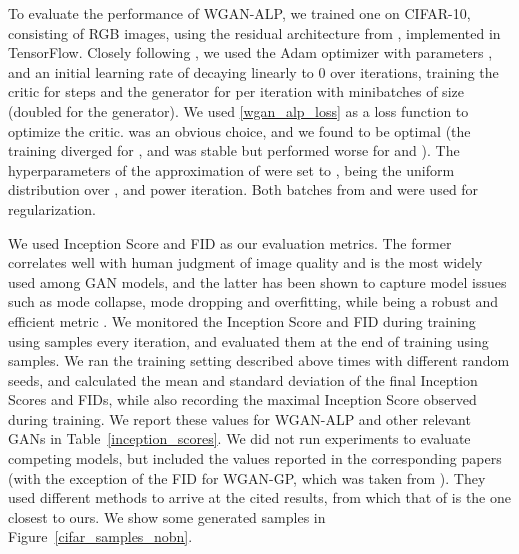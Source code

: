 \documentclass{article}
\begin{document}
To evaluate the performance of WGAN-ALP, we trained one on CIFAR-10, consisting of  RGB images, using the residual architecture from \citet{Gulrajanietal2017}, implemented in TensorFlow. Closely following \citet{Gulrajanietal2017}, we used the Adam optimizer \citep{Kingmaetal2014} with parameters ,  and an initial learning rate of  decaying linearly to 0 over  iterations, training the critic for  steps and the generator for  per iteration with minibatches of size  (doubled for the generator). We used \eqref{wgan_alp_loss} as a loss function to optimize the critic.  was an obvious choice, and we found  to be optimal (the training diverged for , and was stable but performed worse for  and ). The hyperparameters of the approximation of  were set to ,  being the uniform distribution over , and  power iteration. Both batches from  and  were used for regularization.

We used Inception Score \citep{Salimansetal2016} and FID \citep{Heuseletal2017} as our evaluation metrics. The former correlates well with human judgment of image quality and is the most widely used among GAN models, and the latter has been shown to capture model issues such as mode collapse, mode dropping and overfitting, while being a robust and efficient metric \citep{Xuetal2018}. We monitored the Inception Score and FID during training using  samples every  iteration, and evaluated them at the end of training using  samples. We ran the training setting described above  times with different random seeds, and calculated the mean and standard deviation of the final Inception Scores and FIDs, while also recording the maximal Inception Score observed during training. We report these values for WGAN-ALP and other relevant GANs \citep{Gulrajanietal2017, Petzkaetal2018, Zhouetal2019b, Weietal2018, Miyatoetal2018, Adleretal2018, Karrasetal2017} in Table~\ref{inception_scores}. We did not run experiments to evaluate competing models, but included the values reported in the corresponding papers (with the exception of the FID for WGAN-GP, which was taken from \citet{Zhouetal2019b}). They used different methods to arrive at the cited results, from which that of \citet{Adleretal2018} is the one closest to ours. We show some generated samples in Figure~\ref{cifar_samples_nobn}.
\end{document}
